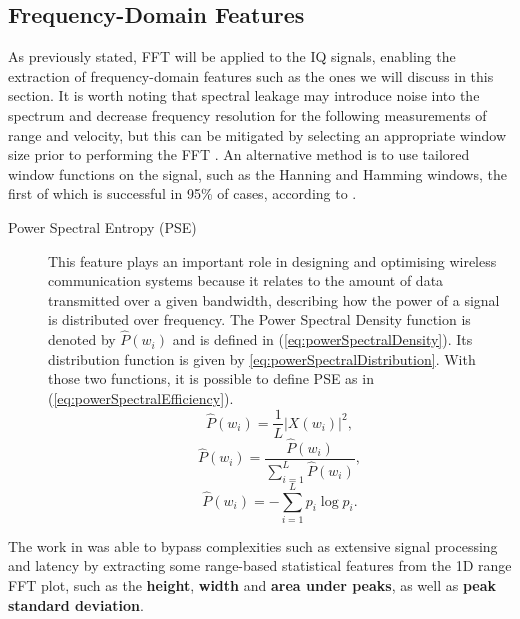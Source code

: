 \subsection{Frequency-Domain Features}
\label{subsec:FrequencyDomainFeatures}
As previously stated, \gls{FFT} will be applied to the \gls{IQ} signals, enabling the extraction of frequency-domain features such as the ones we will discuss in this section. It is worth noting that spectral leakage may introduce noise into the spectrum and decrease frequency resolution for the following measurements of range and velocity, but this can be mitigated by selecting an appropriate window size prior to performing the \gls{FFT} \cite{windowFunctionsSpectralLeakage}. An alternative method is to use tailored window functions on the signal, such as the Hanning and Hamming windows, the first of which is successful in 95\% of cases, according to \cite{windowFFTS}.

\begin{description}

    \item[Power Spectral Entropy (PSE)]    
    This feature plays an important role in designing and optimising wireless communication systems because it relates to the amount of data transmitted over a given bandwidth, describing how the power of a signal is distributed over frequency. The Power Spectral Density function is denoted by $\hat{P}(w_i)$ and is defined in (\ref{eq:powerSpectralDensity}). Its distribution function is given by \ref{eq:powerSpectralDistribution}. With those two functions, it is possible to define \gls{PSE} as in (\ref{eq:powerSpectralEfficiency}).
    \begin{equation} \label{eq:powerSpectralDensity}
     \hat{P}(w_i) = \frac{1}{L} | X (w_i) |^2,
    \end{equation}
    \begin{equation} \label{eq:powerSpectralDistribution}
     \hat{P}(w_i) =  \frac{\hat{P}(w_i)}{\sum_{i=1}^{L} \hat{P}(w_i)},
    \end{equation}
        \begin{equation} \label{eq:powerSpectralEfficiency}
     \hat{P}(w_i) =  - \sum_{i=1}^{L} p_i \log p_i.
    \end{equation}
    
\end{description}

The work in \cite{SOA_1DFFT_freqFeatures} was able to bypass complexities such as extensive signal processing and latency by extracting some range-based statistical features from the 1D range FFT plot, such as the \textbf{height}, \textbf{width} and \textbf{area under peaks}, as well as \textbf{peak standard deviation}.\\
    
